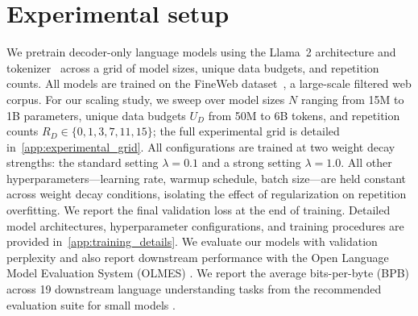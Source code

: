 \section{Experimental setup}
\label{sec:setup}

We pretrain decoder-only language models using the Llama~2 architecture and tokenizer~\citep{touvron2023llama} across a grid of model sizes, unique data budgets, and repetition counts.
All models are trained on the FineWeb dataset~\citep{penedo2024fineweb}, a large-scale filtered web corpus.
For our scaling study, we sweep over model sizes $N$ ranging from 15M to 1B parameters, unique data budgets $U_D$ from 50M to 6B tokens, and repetition counts $R_D \in \{0, 1, 3, 7, 11, 15\}$; the full experimental grid is detailed in~\autoref{app:experimental_grid}.
All configurations are trained at two weight decay strengths: the standard setting $\lambda = 0.1$ and a strong setting $\lambda = 1.0$. All other hyperparameters---learning rate, warmup schedule, batch size---are held constant across weight decay conditions, isolating the effect of regularization on repetition overfitting.
We report the final validation loss at the end of training.
Detailed model architectures, hyperparameter configurations, and training procedures are provided in~\autoref{app:training_details}. We evaluate our models with validation perplexity and also report downstream performance with the Open Language Model Evaluation System (OLMES) \citep{gu2025olmes}. We report the average bits-per-byte (BPB) across 19 downstream language understanding tasks from the recommended evaluation suite for small models \citep{heineman2025signal}.
